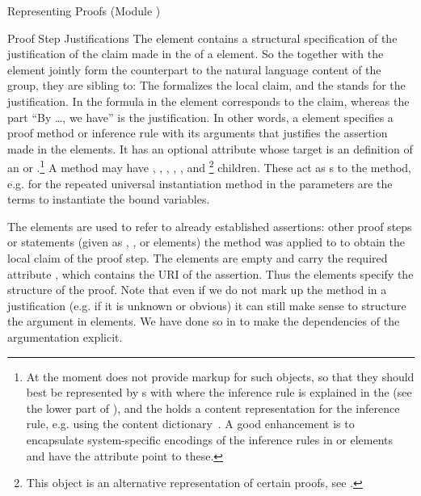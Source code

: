 \begin{tchapter}[id=proofs,short=Representing Proofs]{Representing Proofs (Module {})}
\begin{tsection}[id=proofs:justifications]{Proof Step Justifications}
  The {} element contains a structural specification of the justification of
  the claim made in the {} of a {} element. So the
  {} together with the {} element jointly form the
  counterpart to the natural language content of the {} group, they are
  sibling to: The {} formalizes the local claim, and the {}
  stands for the justification. In {} the formula in the {}
  element corresponds to the claim, whereas the part ``By \ldots, we have'' is the
  justification. In other words, a {} element specifies a proof method or
  inference rule with its arguments that justifies the assertion made in the
  {} elements.  It has an optional {} attribute whose
  target is an {\omdoc} definition of an {} or
  {}.\footnote{At the moment {\omdoc} does not provide markup for
    such objects, so that they should best be represented by {}s with
    {} where the inference rule is explained in the {}
    (see the lower part of {}), and the {} holds a content
    representation for the inference rule, e.g.  using the content
    dictionary~\cite{CD:inference-rules}.  A good enhancement is to encapsulate
    system-specific encodings of the inference rules in {} or
    {} elements and have the {} attribute point to
    these.} A method may have {}, {},
  {}, {}, {}, and
  {}\footnote{This object is an alternative representation of certain
    proofs, see {}.} children.  These act as
  {}s to the method, e.g. for the repeated universal instantiation
  method in {} the parameters are the terms to instantiate the bound
  variables.
  
  The {} elements are used to refer to already established assertions:
  other proof steps or statements (given as {}, {},
  or {} elements) the method was applied to to obtain the local claim of
  the proof step. The {} elements are empty and carry the required
  attribute {}, which contains the URI of the assertion.  Thus
  the {} elements specify the {} structure of the
  proof. Note that even if we do not mark up the method in a justification (e.g. if it is
  unknown or obvious) it can still make sense to structure the argument in
  {} elements. We have done so in {} to make
  the dependencies of the argumentation explicit.
 

\end{tsection}
\end{tchapter}
